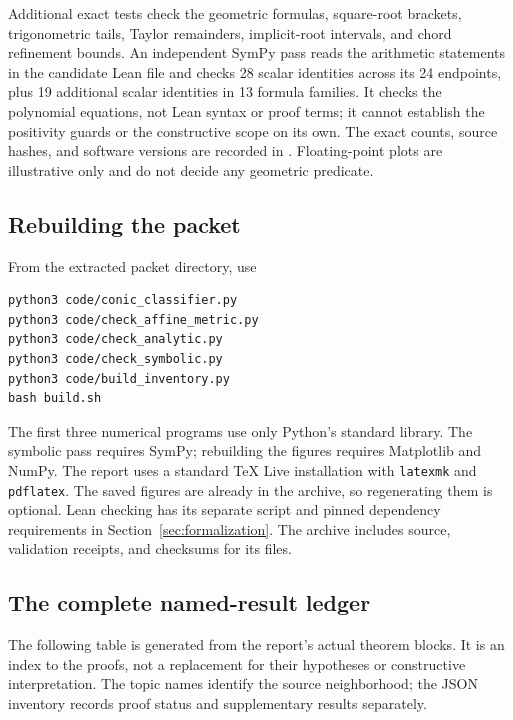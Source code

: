 Additional exact tests check the geometric formulas, square-root brackets,
trigonometric tails, Taylor remainders, implicit-root intervals, and chord
refinement bounds. An independent SymPy pass reads the arithmetic statements
in the candidate Lean file and checks 28 scalar identities across its 24
endpoints, plus 19 additional scalar identities in 13 formula families.
It checks the polynomial equations, not Lean syntax or proof terms; it cannot
establish the positivity guards or the constructive scope on its own.
The exact counts, source hashes, and software versions are recorded in
. Floating-point plots are illustrative only and do not
decide any geometric predicate.

\subsection{Rebuilding the packet}

From the extracted packet directory, use
\begin{lstlisting}
python3 code/conic_classifier.py
python3 code/check_affine_metric.py
python3 code/check_analytic.py
python3 code/check_symbolic.py
python3 code/build_inventory.py
bash build.sh
\end{lstlisting}
The first three numerical programs use only Python's standard library.
The symbolic pass requires SymPy; rebuilding the figures requires Matplotlib
and NumPy. The report uses a standard TeX Live installation with
\texttt{latexmk} and \texttt{pdflatex}. The saved figures are already in the
archive, so regenerating them is optional. Lean checking has its separate
script and pinned dependency requirements in Section~\ref{sec:formalization}.
The archive includes source, validation receipts, and checksums for its files.

\subsection{The complete named-result ledger}

The following table is generated from the report's actual theorem blocks.
It is an index to the proofs, not a replacement for their hypotheses or
constructive interpretation. The topic names identify the source neighborhood;
the JSON inventory records proof status and supplementary results separately.


